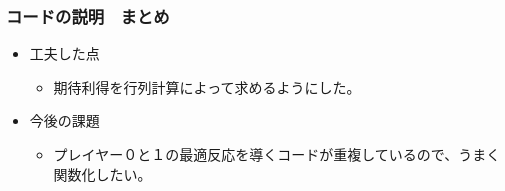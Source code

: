 \documentclass[dvipdfmx,fleqn,handout]{beamer}
\begin{document}
\begin{frame}
\frametitle{コードの説明　まとめ}
\begin{itemize}\setlength{\parskip}{0.5em}
\item
工夫した点
 \begin{itemize}\setlength{\parskip}{0.5em}
 \item
 期待利得を行列計算によって求めるようにした。
 \end{itemize}

\item
今後の課題
 \begin{itemize}\setlength{\parskip}{0.5em}
 \item
 プレイヤー０と１の最適反応を導くコードが重複しているので、うまく関数化したい。
 \end{itemize}
 
\end{itemize}
\end{frame}
\end{document}
